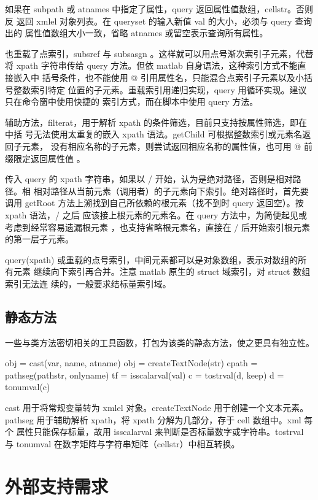 如果在 subpath 或 atnames 中指定了属性，query 返回属性值数组，cellstr。否则反
返回 xmlel 对象列表。在 queryset 的输入新值 val 的大小，必须与 query 查询出的
属性值数组大小一致，省略 atnames 或留空表示查询所有属性。

也重载了点索引，subsref 与 subsasgn 。这样就可以用点号渐次索引子元素，代替将
xpath 字符串传给 query 方法。但依 matlab 自身语法，这种索引方式不能直接嵌入中
括号条件，也不能使用 @ 引用属性名，只能混合点索引子元素以及小括号整数索引特定
位置的子元素。重载索引用递归实现，query 用循环实现。建议只在命令窗中使用快捷的
索引方式，而在脚本中使用 query 方法。

辅助方法，filterat，用于解析 xpath 的条件筛选，目前只支持按属性筛选，即在中括
号无法使用太重复的嵌入 xpath 语法。getChild 可根据整数索引或元素名返回子元素，
没有相应名称的子元素，则尝试返回相应名称的属性值，也可用 @ 前缀限定返回属性值
。

传入 query 的 xpath 字符串，如果以 / 开始，认为是绝对路径，否则是相对路径。相
相对路径从当前元素（调用者）的子元素向下索引。绝对路径时，首先要调用 getRoot
方法上溯找到自己所依赖的根元素（找不到时 query 返回空）。按 xpath 语法，/ 之后
应该接上根元素的元素名。在 query 方法中，为简便起见或考虑到经常容易遗漏根元素
，也支持省略根元素名，直接在 / 后开始索引根元素的第一层子元素。

query(xpath) 或重载的点号索引，中间元素都可以是对象数组，表示对数组的所有元素
继续向下索引再合并。注意 matlab 原生的 struct 域索引，对 struct 数组索引无法连
续的，一般要求结标量索引域。

\subsection{静态方法}

一些与类方法密切相关的工具函数，打包为该类的静态方法，使之更具有独立性。

obj = cast(var, name, atname)
obj = createTextNode(str)
cpath = pathseg(pathstr, onlyname)
tf = isscalarval(val)
c = tostrval(d, keep)
d = tonumval(c)

cast 用于将常规变量转为 xmlel 对象。createTextNode 用于创建一个文本元素。
pathseg 用于辅助解析 xpath，将 xpath 分解为几部分，存于 cell 数组中。xml 每个
属性只能保存标量，故用 isscalarval 来判断是否标量数字或字符串。tostrval 与
tonumval 在数字矩阵与字符串矩阵（cellstr）中相互转换。

\section{外部支持需求}

